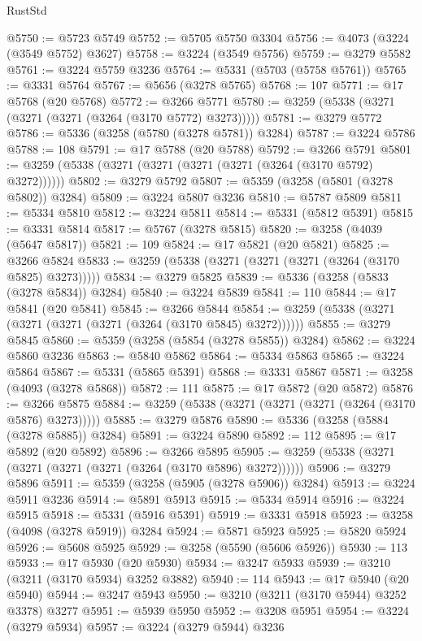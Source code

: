 \begin{lexlean}{RustStd}
\begin{coremodule}
@5750 := @5723 @5749
@5752 := @5705 @5750 @3304
@5756 := @4073 (@3224 (@3549 @5752) @3627)
@5758 := @3224 (@3549 @5756)
@5759 := @3279 @5582
@5761 := @3224 @5759 @3236
@5764 := @5331 (@5703 (@5758 @5761))
@5765 := @3331 @5764
@5767 := @5656 (@3278 @5765)
@5768 := 107
@5771 := @17 @5768 (@20 @5768)
@5772 := @3266 @5771
@5780 := @3259 (@5338 (@3271 (@3271 (@3271 (@3264 (@3170 @5772) @3273)))))
@5781 := @3279 @5772
@5786 := @5336 (@3258 (@5780 (@3278 @5781)) @3284)
@5787 := @3224 @5786
@5788 := 108
@5791 := @17 @5788 (@20 @5788)
@5792 := @3266 @5791
@5801 := @3259 (@5338 (@3271 (@3271 (@3271 (@3271 (@3264 (@3170 @5792) @3272))))))
@5802 := @3279 @5792
@5807 := @5359 (@3258 (@5801 (@3278 @5802)) @3284)
@5809 := @3224 @5807 @3236
@5810 := @5787 @5809
@5811 := @5334 @5810
@5812 := @3224 @5811
@5814 := @5331 (@5812 @5391)
@5815 := @3331 @5814
@5817 := @5767 (@3278 @5815)
@5820 := @3258 (@4039 (@5647 @5817))
@5821 := 109
@5824 := @17 @5821 (@20 @5821)
@5825 := @3266 @5824
@5833 := @3259 (@5338 (@3271 (@3271 (@3271 (@3264 (@3170 @5825) @3273)))))
@5834 := @3279 @5825
@5839 := @5336 (@3258 (@5833 (@3278 @5834)) @3284)
@5840 := @3224 @5839
@5841 := 110
@5844 := @17 @5841 (@20 @5841)
@5845 := @3266 @5844
@5854 := @3259 (@5338 (@3271 (@3271 (@3271 (@3271 (@3264 (@3170 @5845) @3272))))))
@5855 := @3279 @5845
@5860 := @5359 (@3258 (@5854 (@3278 @5855)) @3284)
@5862 := @3224 @5860 @3236
@5863 := @5840 @5862
@5864 := @5334 @5863
@5865 := @3224 @5864
@5867 := @5331 (@5865 @5391)
@5868 := @3331 @5867
@5871 := @3258 (@4093 (@3278 @5868))
@5872 := 111
@5875 := @17 @5872 (@20 @5872)
@5876 := @3266 @5875
@5884 := @3259 (@5338 (@3271 (@3271 (@3271 (@3264 (@3170 @5876) @3273)))))
@5885 := @3279 @5876
@5890 := @5336 (@3258 (@5884 (@3278 @5885)) @3284)
@5891 := @3224 @5890
@5892 := 112
@5895 := @17 @5892 (@20 @5892)
@5896 := @3266 @5895
@5905 := @3259 (@5338 (@3271 (@3271 (@3271 (@3271 (@3264 (@3170 @5896) @3272))))))
@5906 := @3279 @5896
@5911 := @5359 (@3258 (@5905 (@3278 @5906)) @3284)
@5913 := @3224 @5911 @3236
@5914 := @5891 @5913
@5915 := @5334 @5914
@5916 := @3224 @5915
@5918 := @5331 (@5916 @5391)
@5919 := @3331 @5918
@5923 := @3258 (@4098 (@3278 @5919)) @3284
@5924 := @5871 @5923
@5925 := @5820 @5924
@5926 := @5608 @5925
@5929 := @3258 (@5590 (@5606 @5926))
@5930 := 113
@5933 := @17 @5930 (@20 @5930)
@5934 := @3247 @5933
@5939 := @3210 (@3211 (@3170 @5934) @3252 @3882)
@5940 := 114
@5943 := @17 @5940 (@20 @5940)
@5944 := @3247 @5943
@5950 := @3210 (@3211 (@3170 @5944) @3252 @3378) @3277
@5951 := @5939 @5950
@5952 := @3208 @5951
@5954 := @3224 (@3279 @5934)
@5957 := @3224 (@3279 @5944) @3236

\end{coremodule}
\end{lexlean}

